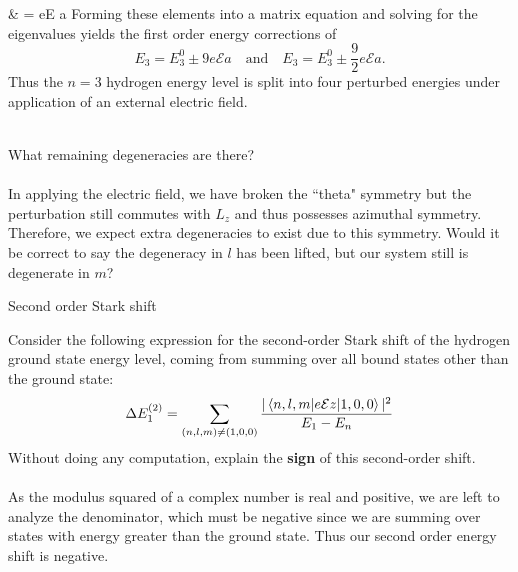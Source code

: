 \documentclass[10pt,letterpaper]{article}
\begin{document}
			   & =  e\mathcal E a
		\ea
		Forming these elements into a matrix equation and solving for the eigenvalues yields the first order 
		energy corrections of 
		\[
			E_3 = E_3^0 \pm 9 e\mathcal E a \quad \text{and}\quad E_3 = E_3^0\pm \frac{9}{2}e\mathcal E a.
		\]
		Thus the $n=3$ hydrogen energy level is split into four perturbed energies under application of an external
		electric field. 
		\\
		\\
		\item
		What remaining degeneracies are there?
		\\
		\\
		In applying the electric field, we have broken the ``theta" symmetry but the perturbation still commutes with 
		$L_z$ and thus possesses azimuthal symmetry. Therefore, we expect extra degeneracies to exist due to this
		symmetry. Would it be correct to say the degeneracy in $l$ has been lifted, but our system still is 
		degenerate in $m$? 
		\\
	\eenum
	
	
	\item
	Second order Stark shift
	\benum
	
		\item
		Consider the following expression for the second-order Stark shift of the hydrogen ground state energy level, coming from
		summing over all bound states other than the ground state:
		\[
			\Delta E_1^{(2)} = \sum_{(n,l,m)\ne(1,0,0)} \frac{|\braket{n,l,m|e\mathcal E z|1,0,0}|^2}{E_1-E_n}
		\]
		Without doing any computation, explain the \textbf{sign} of this second-order shift.
		\\
		\\
		As the modulus squared of a complex number is real and positive, we are left to analyze the denominator, which
		must be negative since we are summing over states with energy greater than the ground state. Thus 
		our second order energy shift is negative. 
		\\
		
\end{document}
